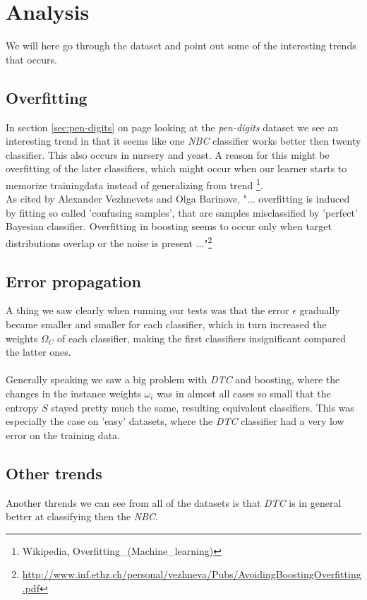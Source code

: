 \documentclass[12pt]{article}
\newcommand{\NBC}{\textit{NBC}}
\newcommand{\DTC}{\textit{DTC}}
\begin{document}
\pagebreak
\section{Analysis}
	We will here go through the dataset and point out some of the interesting trends that occurs.
	\subsection{Overfitting}
	In section \ref{sec:pen-digits} on page \pageref{sec:pen-digits} looking at the \textit{pen-digits} dataset we see an interesting trend in that it seems like one \NBC{} classifier works better then twenty classifier. This also occurs in nursery and yeast. A reason for this might be overfitting of the later classifiers, which might occur when our learner starts to memorize trainingdata instead of generalizing from trend \footnote{Wikipedia, Overfitting\_(Machine\_learning)}. \\
	As cited by Alexander Vezhnevets and Olga Barinove, "... overfitting is induced by fitting so called 'confusing samples', that are samples misclassified by 'perfect' Bayesian classifier. Overfitting in boosting seems to occur only when target distributions overlap or the noise is present ..."\footnote{\url{http://www.inf.ethz.ch/personal/vezhneva/Pubs/AvoidingBoostingOverfitting.pdf}}
	
	\subsection{Error propagation}
			A thing we saw clearly when running our tests was that the error $\epsilon$ gradually became smaller and smaller for each classifier, which in turn increased the weights $\Omega_C$ of each classifier, making the first classifiers insignificant compared the latter ones. \\\\
			Generally speaking we saw a big problem with \DTC{} and boosting, where the changes in the instance weights $\omega_i$ was in almost all cases so small that the entropy $S$ stayed pretty much the same, resulting equivalent classifiers. This was especially the case on 'easy' datasets, where the \DTC{} classifier had a very low error on the training data.

	\subsection{Other trends}
		Another thrends we can see from all of the datasets is that \DTC{} is in general better at classifying then the \NBC{}.
	
	
\end{document}
